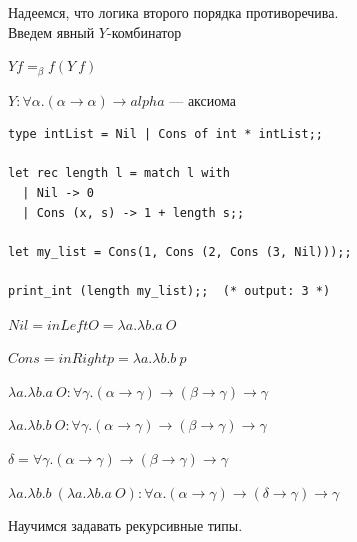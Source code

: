 \documentclass[12pt]{article}
\begin{document}
Надеемся, что логика второго порядка противоречива. \\
Введем явный $Y$-комбинатор

$Y f =_\beta f (Y\ f)$

$Y : \forall \alpha . (\alpha \rightarrow \alpha) \rightarrow alpha$ --- аксиома

\begin{verbatim}
type intList = Nil | Cons of int * intList;;

let rec length l = match l with 
  | Nil -> 0
  | Cons (x, s) -> 1 + length s;;

let my_list = Cons(1, Cons (2, Cons (3, Nil)));;

print_int (length my_list);;  (* output: 3 *)
\end{verbatim}

$Nil = inLeft O = \lambda a. \lambda b. a\ O$ 

$Cons = inRight p = \lambda a. \lambda b. b\ p$

$\lambda a. \lambda b. a\ O : \forall \gamma .(\alpha \rightarrow \gamma) \rightarrow (\beta \rightarrow \gamma) \rightarrow \gamma$

$\lambda a. \lambda b. b\ O: \forall \gamma .(\alpha \rightarrow \gamma) \rightarrow (\beta \rightarrow \gamma) \rightarrow \gamma$

$\delta = \forall \gamma .(\alpha \rightarrow \gamma) \rightarrow (\beta \rightarrow \gamma) \rightarrow \gamma$

$\lambda a. \lambda b. b\ (\lambda a. \lambda b. a\ O) : \forall \alpha. (\alpha \rightarrow \gamma) \rightarrow (\delta \rightarrow \gamma) \rightarrow \gamma$

Научимся задавать рекурсивные типы.
\end{document}
